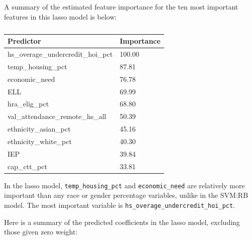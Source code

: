 \documentclass[
  man,floatsintext]{apa6}
\begin{document}
A summary of the estimated feature importance for the ten most important features in this lasso model is below:

\begin{table}[H]

\begin{center}
\begin{threeparttable}

\caption{\label{tab:unnamed-chunk-12}}

\begin{tabular}{ll}
\toprule
Predictor & \multicolumn{1}{c}{Importance}\\
\midrule
hs\_overage\_undercredit\_hoi\_pct & 100.00\\
temp\_housing\_pct & 87.81\\
economic\_need & 76.78\\
ELL & 69.99\\
hra\_elig\_pct & 68.80\\
val\_attendance\_remote\_hs\_all & 50.39\\
ethnicity\_asian\_pct & 45.16\\
ethnicity\_white\_pct & 40.30\\
IEP & 39.84\\
cap\_ctt\_pct & 33.81\\
\bottomrule
\end{tabular}

\end{threeparttable}
\end{center}

\end{table}

In the lasso model, \texttt{temp\_housing\_pct} and \texttt{economic\_need} are relatively more important than any race or gender percentage variables, unlike in the SVM:RB model. The most important variable is \texttt{hs\_overage\_undercredit\_hoi\_pct}.

Here is a summary of the predicted coefficients in the lasso model, excluding those given zero weight:
\end{document}
